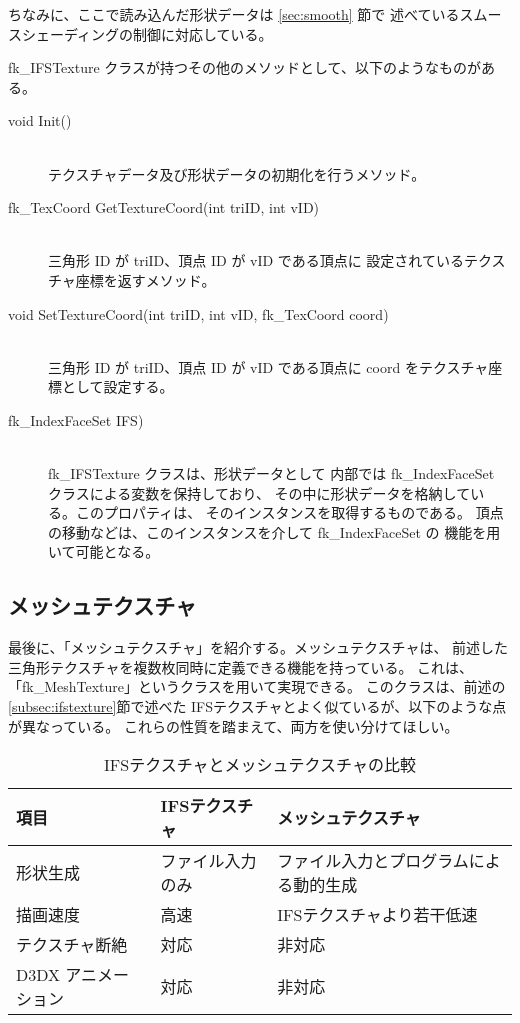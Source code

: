 ちなみに、ここで読み込んだ形状データは \ref{sec:smooth} 節で
述べているスムースシェーディングの制御に対応している。

fk\_IFSTexture クラスが持つその他のメソッドとして、以下のようなものがある。
\begin{description}
\item[void Init()] ~ \\
	テクスチャデータ及び形状データの初期化を行うメソッド。\\

\item[fk\_TexCoord GetTextureCoord(int triID, int vID)] ~ \\
	三角形 ID が triID、頂点 ID が vID である頂点に
	設定されているテクスチャ座標を返すメソッド。\\

\item[void SetTextureCoord(int triID, int vID, fk\_TexCoord coord)] ~ \\
	三角形 ID が triID、頂点 ID が vID である頂点に
	coord をテクスチャ座標として設定する。\\

\item[fk\_IndexFaceSet IFS)] ~ \\
	fk\_IFSTexture クラスは、形状データとして
	内部では fk\_IndexFaceSet クラスによる変数を保持しており、
	その中に形状データを格納している。このプロパティは、
	そのインスタンスを取得するものである。
	頂点の移動などは、このインスタンスを介して fk\_IndexFaceSet の
	機能を用いて可能となる。
\end{description}

\subsection{メッシュテクスチャ}
最後に、「メッシュテクスチャ」を紹介する。メッシュテクスチャは、
前述した三角形テクスチャを複数枚同時に定義できる機能を持っている。
これは、「fk\_MeshTexture」というクラスを用いて実現できる。
このクラスは、前述の \ref{subsec:ifstexture}節で述べた
IFSテクスチャとよく似ているが、以下のような点が異なっている。
これらの性質を踏まえて、両方を使い分けてほしい。

\begin{table}[H]
\caption{IFSテクスチャとメッシュテクスチャの比較}
\label{tbl:meshtexture}
\begin{center}
\begin{tabular}{|l||l|l|}
\hline
項目 & IFSテクスチャ & メッシュテクスチャ \\ \hline \hline
形状生成 & ファイル入力のみ & ファイル入力とプログラムによる動的生成 \\ \hline
描画速度 & 高速 & IFSテクスチャより若干低速 \\ \hline
テクスチャ断絶 & 対応 & 非対応 \\ \hline
D3DX アニメーション & 対応 & 非対応 \\ \hline
\end{tabular}
\end{center}
\end{table}

